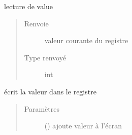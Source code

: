 \documentclass[letterpaper,10pt,french]{sphinxmanual}
\begin{document}
\begin{fulllineitems}
\begin{fulllineitems}
\end{fulllineitems}


\begin{fulllineitems}
\label{\detokenize{executeurcomponents:executeurcomponents.RegisterComponent.read}}
lecture de value
\begin{quote}\begin{description}
\item[{Renvoie}] \leavevmode
valeur courante du registre

\item[{Type renvoyé}] \leavevmode
int

\end{description}\end{quote}

\end{fulllineitems}


\begin{fulllineitems}
\label{\detokenize{executeurcomponents:executeurcomponents.RegisterComponent.write}}
écrit la valeur dans le registre
\begin{quote}\begin{description}
\item[{Paramètres}] \leavevmode
{} (\sphinxstyleliteralemphasis{\sphinxupquote{{[}}}{\hyperref[\detokenize{executeurcomponents:executeurcomponents.DataValue}]{\sphinxcrossref{\sphinxstyleliteralemphasis{\sphinxupquote{DataValue}}}}}\sphinxstyleliteralemphasis{\sphinxupquote{,}}\sphinxstyleliteralemphasis{\sphinxupquote{{]}}}) \textendash{} ajoute valeur à l’écran

\end{description}\end{quote}

\end{fulllineitems}


\end{fulllineitems}
\end{document}

